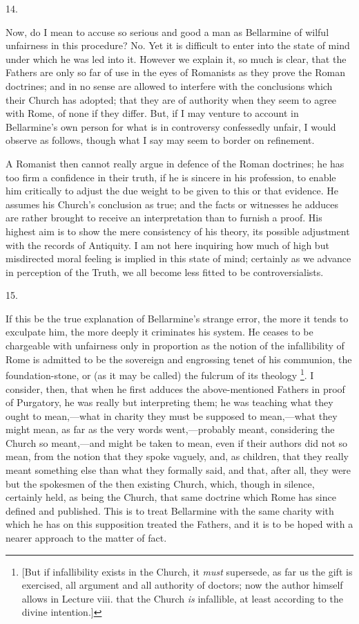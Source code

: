 14.

Now, do I mean to accuse so serious and good a man as Bellarmine of
wilful unfairness in this procedure? No. Yet it is difficult to enter
into the state of mind under which he was led into it. However we
explain it, so much is clear, that the Fathers are only so far of use
in the eyes of Romanists as they prove the Roman doctrines; and in no
sense are allowed to interfere with the conclusions which their Church
has adopted; that they are of authority when they seem to agree with
Rome, of none if they differ. But, if I may venture to account in
Bellarmine's own person for what is in controversy confessedly unfair,
I would observe as follows, though what I say may seem to border on
refinement.

A Romanist then cannot really argue in defence of the Roman
doctrines; he has too firm a confidence in their truth, if he is
sincere in his profession, to enable him critically to adjust the due
weight to be given to this or that evidence. He assumes his
Church's conclusion as true; and the facts or witnesses he adduces are
rather brought to receive an interpretation than to furnish a proof.
His highest aim is to show the mere consistency of his theory, its
possible adjustment with the records of Antiquity. I am not here
inquiring how much of high but misdirected moral feeling is implied in
this state of mind; certainly as we advance in perception of the
Truth, we all become less fitted to be controversialists.

15.

If this be the true explanation of Bellarmine's strange error, the
more it tends to exculpate him, the more deeply it criminates his
system. He ceases to be chargeable with unfairness only in proportion
as the notion of the infallibility of Rome is admitted to be the
sovereign and engrossing tenet of his communion, the foundation-stone,
or (as it may be called) the fulcrum of its theology \footnote{[But if infallibility exists in the
Church, it \emph{must} supersede, as far us the gift is exercised, all
argument and all authority of doctors; now the author himself allows
in Lecture viii. that the Church \emph{is} infallible, at least
according to the divine intention.]}. I consider, then, that when he first adduces the
above-mentioned Fathers in proof of Purgatory, he was really but
interpreting them; he was teaching what they ought to mean,—what in
charity they must be supposed to mean,—what they might mean, as far
as the very words went,—probably meant, considering the Church so
meant,—and might be taken to mean, even if their authors did not so
mean, from the notion that they spoke vaguely, and, as children, that
they really meant something else than what they formally said, and
that, after all, they were but the spokesmen of the then existing
Church, which, though in silence, certainly held, as being the Church,
that same doctrine which Rome has since defined and published. This is
to treat Bellarmine with the same charity with which he has on
this supposition treated the Fathers, and it is to be hoped with a
nearer approach to the matter of fact.

